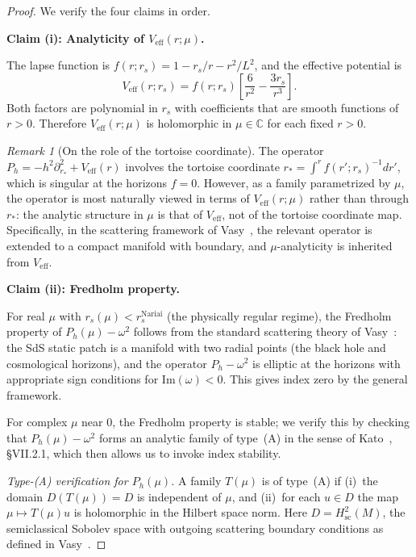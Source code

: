 \documentclass[12pt,a4paper]{amsart}
\theoremstyle{remark}
\newtheorem{remark}[theorem]{Remark}
\begin{document}
\begin{proof}
We verify the four claims in order.

\medskip
\noindent\textbf{Claim (i): Analyticity of $V_{\mathrm{eff}}(r;\mu)$.}

The lapse function is $f(r; r_s) = 1 - r_s/r - r^2/L^2$, and the
effective potential is
\[
  V_{\mathrm{eff}}(r; r_s) = f(r;r_s)\!\left[\frac{6}{r^2} - \frac{3r_s}{r^3}\right].
\]
Both factors are polynomial in $r_s$ with coefficients that are smooth
functions of $r > 0$. Therefore $V_{\mathrm{eff}}(r;\mu)$ is
holomorphic in $\mu \in \mathbb{C}$ for each fixed $r > 0$.

\begin{remark}[On the role of the tortoise coordinate]
The operator $P_h = -h^2\partial_{r_*}^2 + V_{\mathrm{eff}}(r)$
involves the tortoise coordinate $r_* = \int^r f(r';r_s)^{-1}dr'$,
which is singular at the horizons $f = 0$. However, as a family
parametrized by $\mu$, the operator is most naturally viewed in terms
of $V_{\mathrm{eff}}(r;\mu)$ rather than through $r_*$: the analytic
structure in $\mu$ is that of $V_{\mathrm{eff}}$, not of the tortoise
coordinate map. Specifically, in the scattering framework of
Vasy~\cite{Vasy2013}, the relevant operator is extended to a compact
manifold with boundary, and $\mu$-analyticity is inherited from
$V_{\mathrm{eff}}$.
\end{remark}

\medskip
\noindent\textbf{Claim (ii): Fredholm property.}

For real $\mu$ with $r_s(\mu) < r_s^{\mathrm{Nariai}}$ (the physically
regular regime), the Fredholm property of $P_h(\mu) - \omega^2$ follows
from the standard scattering theory of Vasy~\cite{Vasy2013}: the SdS
static patch is a manifold with two radial points (the black hole and
cosmological horizons), and the operator $P_h - \omega^2$ is
elliptic at the horizons with appropriate sign conditions for
$\mathrm{Im}(\omega) < 0$. This gives index zero by the general
framework.

For complex $\mu$ near $0$, the Fredholm property is stable; we
verify this by checking that $P_h(\mu) - \omega^2$ forms an analytic
family of type~(A) in the sense of Kato~\cite{Kato66}, \S VII.2.1,
which then allows us to invoke index stability.

\emph{Type-(A) verification for $P_h(\mu)$.}
A family $T(\mu)$ is of type~(A) if (i)~the domain
$D(T(\mu)) = D$ is independent of $\mu$, and (ii)~for each $u \in D$
the map $\mu \mapsto T(\mu)u$ is holomorphic in the Hilbert space norm.
Here $D = H^2_{\mathrm{sc}}(M)$, the semiclassical Sobolev space with
outgoing scattering boundary conditions as defined in
Vasy~\cite{Vasy2013}.


\end{proof}
\end{document}
